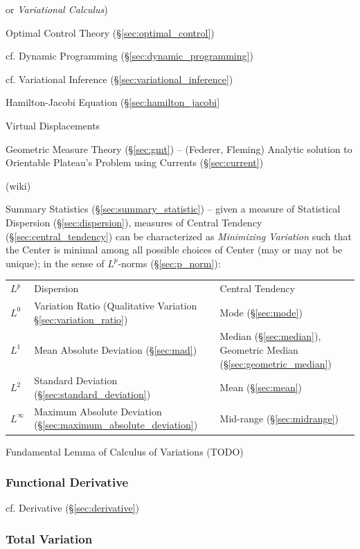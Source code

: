 {or \emph{Variational Calculus})

\fist Optimal Control Theory (\S\ref{sec:optimal_control})

\fist cf. Dynamic Programming (\S\ref{sec:dynamic_programming})

\fist cf. Variational Inference (\S\ref{sec:variational_inference})

Hamilton-Jacobi Equation (\S\ref{sec:hamilton_jacobi}

Virtual Displacements

\fist Geometric Measure Theory (\S\ref{sec:gmt}) -- (Federer, Fleming) Analytic
solution to Orientable Plateau's Problem using Currents (\S\ref{sec:current})

(wiki)

Summary Statistics (\S\ref{sec:summary_statistic}) -- given a measure of
Statistical Dispersion (\S\ref{sec:dispersion}), measures of Central Tendency
(\S\ref{sec:central_tendency}) can be characterized as \emph{Minimizing
  Variation} such that the Center is minimal among all possible choices of
Center (may or may not be unique); in the sense of $L^p$-norms
(\S\ref{sec:p_norm}):
\begin{tabular}{l l l}
  $L^p$ & Dispersion & Central Tendency \\
  $L^0$ & Variation Ratio (Qualitative Variation \S\ref{sec:variation_ratio})
    & Mode (\S\ref{sec:mode}) \\
  $L^1$ & Mean Absolute Deviation (\S\ref{sec:mad})
    & Median (\S\ref{sec:median}),
      Geometric Median (\S\ref{sec:geometric_median}) \\
  $L^2$ & Standard Deviation (\S\ref{sec:standard_deviation})
    & Mean (\S\ref{sec:mean}) \\
  $L^\infty$
    & Maximum Absolute Deviation (\S\ref{sec:maximum_absolute_deviation})
    & Mid-range (\S\ref{sec:midrange})
\end{tabular}

Fundamental Lemma of Calculus of Variations (TODO)



\subsubsection{Functional Derivative}\label{sec:functional_derivative}

\fist cf. Derivative (\S\ref{sec:derivative})



\subsubsection{Total Variation}\label{sec:total_variation}

}
